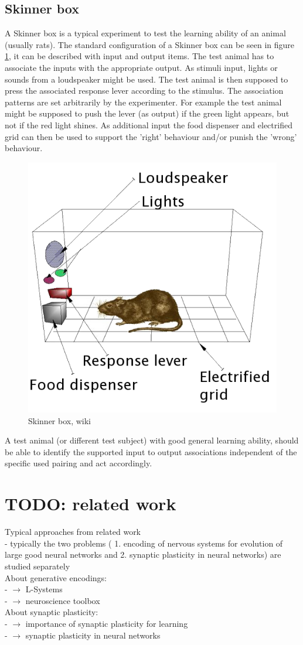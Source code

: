 \documentclass[12pt,twoside]{article}
\theoremstyle{plain}
\theoremstyle{definition}
\theoremstyle{remark}
\begin{document}
\subsection{Skinner box}
A Skinner box is a typical experiment to test the learning ability of an animal (usually rats).
The standard configuration of a Skinner box can be seen in figure \ref{fig:skinner}, it can be described with input and output items.
The test animal has to associate the inputs with the	appropriate output.
As stimuli input, lights or sounds from a loudspeaker might be used. The test animal is then supposed to press the associated response lever according to the stimulus.
The association patterns are set arbitrarily by the experimenter. For example the test animal might be supposed to push the lever (as output) if the green light appears, but not if the red light shines.
As additional input the food dispenser and electrified grid can then be used to support the 'right' behaviour and/or punish the 'wrong' behaviour.

\begin{figure}[h]
	\begin{center}
		\includegraphics[width=.43\textwidth]{Skinner_box_scheme_01.png}
	\end{center}
	\caption{Skinner box, wiki}
	\label{fig:skinner}
\end{figure}

A test animal (or different test subject) with good general learning ability, should be able to identify the supported input to output associations independent of the specific used pairing and act accordingly.

\section{TODO: related work}
\label{sec:related_work}
Typical approaches from related work\\
- typically the two problems ( 1. encoding of nervous systems for evolution of large good neural networks and 2. synaptic plasticity in neural networks) are studied separately\\
About generative encodings: \\
- \cite{hornby2001body} $\rightarrow$ L-Systems\\
- \cite{mouret2010importing} $\rightarrow$ neuroscience toolbox\\
About synaptic plasticity:\\
- \cite{hebb2005organization} $\rightarrow$ importance of synaptic plasticity for learning\\
- \cite{abbott2000synaptic} $\rightarrow$ synaptic plasticity in neural networks
\end{document}
